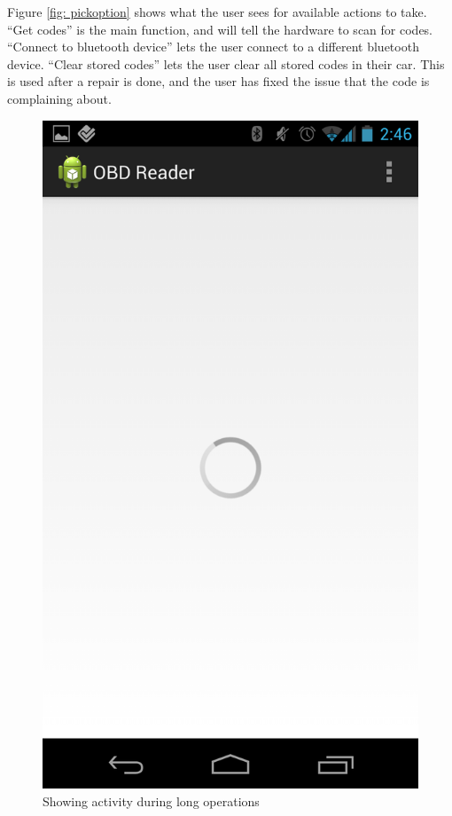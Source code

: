 \documentclass[12pt,letterpaper]{article}
\begin{document}
Figure \ref{fig: pickoption} shows what the user sees for available actions to take. ``Get codes'' is the main function, and will tell the hardware to scan for codes. ``Connect to bluetooth device'' lets the user connect to a different bluetooth device. ``Clear stored codes'' lets the user clear all stored codes in their car. This is used after a repair is done, and the user has fixed the issue that the code is complaining about.

\begin{figure}[H]
\centering
\includegraphics[totalheight=15cm]{images/spinner.png}
\caption{Showing activity during long operations}
\label{fig: spinner}
\end{figure}
\end{document}
